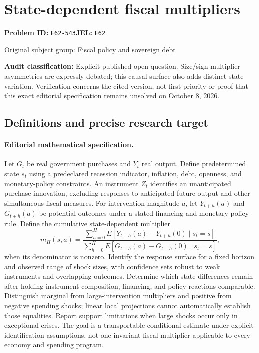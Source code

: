 \documentclass[11pt,a4paper]{article}
\begin{document}
\section*{State-dependent fiscal multipliers}
\textbf{Problem ID:} \texttt{E62-543}\quad \textbf{JEL:} \texttt{E62}\par
\label{problem:OP-0251}
{\sffamily\small\color{muted}Original subject group: Fiscal policy and sovereign debt\par}
\label{definitions:problem:30007532}
\textbf{Audit classification:} Explicit published open question. Size/sign multiplier asymmetries are expressly debated; this causal surface also adds distinct state variation. Verification concerns the cited version, not first priority or proof that this exact editorial specification remains unsolved on October 8, 2026.
\subsection*{Definitions and precise research target}
\paragraph{Editorial mathematical specification.} Let \(G_t\) be real government purchases and \(Y_t\) real output. Define predetermined state \(s_t\) using a predeclared recession indicator, inflation, debt, openness, and monetary-policy constraints. An instrument \(Z_t\) identifies an unanticipated purchase innovation, excluding responses to anticipated future output and other simultaneous fiscal measures. For intervention magnitude \(a\), let \(Y_{t+h}(a)\) and \(G_{t+h}(a)\) be potential outcomes under a stated financing and monetary-policy rule. Define the cumulative state-dependent multiplier
\[
m_H(s,a)=
\frac{\sum_{h=0}^H E[Y_{t+h}(a)-Y_{t+h}(0)\mid s_t=s]}
{\sum_{h=0}^H E[G_{t+h}(a)-G_{t+h}(0)\mid s_t=s]},
\]
when its denominator is nonzero. Identify the response surface for a fixed horizon and observed range of shock sizes, with confidence sets robust to weak instruments and overlapping outcomes. Determine which state differences remain after holding instrument composition, financing, and policy reactions comparable. Distinguish marginal from large-intervention multipliers and positive from negative spending shocks; linear local projections cannot automatically establish those equalities. Report support limitations when large shocks occur only in exceptional crises. The goal is a transportable conditional estimate under explicit identification assumptions, not one invariant fiscal multiplier applicable to every economy and spending program.
\end{document}
